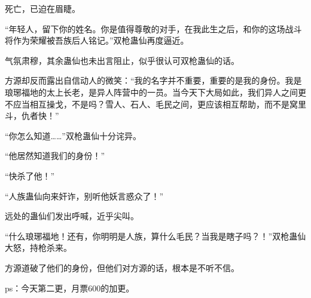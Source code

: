 \begin{this_body}
死亡，已迫在眉睫。

“年轻人，留下你的姓名。你是值得尊敬的对手，在我此生之后，和你的这场战斗将作为荣耀被吾族后人铭记。”双枪蛊仙再度逼近。

气氛肃穆，其余蛊仙也未出言阻止，似乎很认可双枪蛊仙的话。

方源却反而露出自信动人的微笑：“我的名字并不重要，重要的是我的身份。我是琅琊福地的太上长老，是异人阵营中的一员。当今天下大局如此，我们异人之间更不应当相互操戈，不是吗？雪人、石人、毛民之间，更应该相互帮助，而不是窝里斗，仇者快！”

“你怎么知道……”双枪蛊仙十分诧异。

“他居然知道我们的身份！”

“快杀了他！”

“人族蛊仙向来奸诈，别听他妖言惑众了！”

远处的蛊仙们发出呼喊，近乎尖叫。

“什么琅琊福地！还有，你明明是人族，算什么毛民？当我是瞎子吗？！”双枪蛊仙大怒，持枪杀来。

方源道破了他们的身份，但他们对方源的话，根本是不听不信。

ps：今天第二更，月票600的加更。

\end{this_body}

